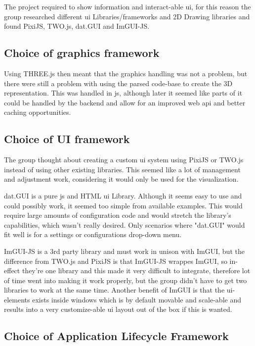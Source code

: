 The project required to show information and interact-able \gls{ui}, for this reason the group researched different \gls{ui} Libraries/frameworks and 2D Drawing libraries and found PixiJS, TWO.js, dat.GUI and ImGUI-JS.

\subsection{Choice of graphics framework}
Using THREE.js then meant that the graphics handling was not a problem, but there were still a problem with using the parsed code-base to create the 3D representation. This was handled in \Gls{js}, although later it seemed like parts of it could be handled by the \gls{backend} and allow for an improved web \gls{api} and better caching opportunities. 

\subsection{Choice of UI framework}
The group thought about creating a custom \gls{ui} system using PixiJS or TWO.js instead of using other existing libraries. This seemed like a lot of management and adjustment work, considering it would only be used for the visualization. 

dat.GUI is a pure \Gls{js} and HTML \gls{ui} Library. Although it seems easy to use and could possibly work, it seemed too simple from available examples. This would require large amounts of configuration code and would stretch the library's capabilities, which wasn't really desired. Only scenarios where "dat.GUI" would fit well is for a settings or configurations drop-down menu.

ImGUI-JS is a 3rd party library and must work in unison with ImGUI, but the difference from TWO.js and PixiJS is that ImGUI-JS wrappes ImGUI, so in-effect they're one library and this made it very difficult to integrate, therefore lot of time went into making it work properly, but the group didn't have to get two libraries to work at the same time. Another benefit of ImGUI is that the \gls{ui}-elements exists inside windows which is by default movable and scale-able and results into a very customize-able \gls{ui} layout out of the box if this is wanted.

\subsection{Choice of Application Lifecycle Framework}

